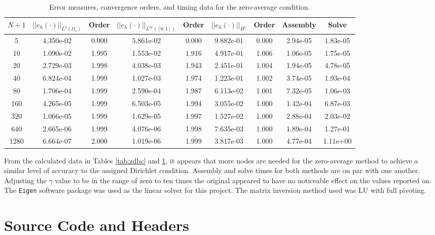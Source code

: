\documentclass[a4paper, 12pt]{article}
\begin{document}
\begin{table}[H]
\caption{ Error measures, convergence orders, and timing data for the zero-average condition.}
\vspace{0.1in}
\centering
\begin{tabular}{|c|c|c|c|c|c|c|c|c|}
\hline
 $N+1$&  $||e_h(\cdot)||_{L^2(\Omega_c)}$ & Order & $||e_h(\cdot)||_{L^\infty([0,1])}$ & Order & $||e_h(\cdot)||_{H^1}$ & Order & Assembly & Solve \\
 \hline   %
5    & 4.350e-02 & 0.000 & 5.861e-02 & 0.000 & 9.882e-01 & 0.000 & 2.94e-05 & 1.83e-05\\
10   & 1.090e-02 & 1.995 & 1.553e-02 & 1.916 & 4.917e-01 & 1.006 & 1.06e-05 & 1.75e-05\\
20   & 2.729e-03 & 1.998 & 4.038e-03 & 1.943 & 2.451e-01 & 1.004 & 1.94e-05 & 4.78e-05\\
40   & 6.824e-04 & 1.999 & 1.027e-03 & 1.974 & 1.223e-01 & 1.002 & 3.74e-05 & 1.93e-04\\
80   & 1.706e-04 & 1.999 & 2.590e-04 & 1.987 & 6.113e-02 & 1.001 & 7.32e-05 & 1.06e-03\\
160  & 4.265e-05 & 1.999 & 6.503e-05 & 1.994 & 3.055e-02 & 1.000 & 1.42e-04 & 6.87e-03\\
320  & 1.066e-05 & 1.999 & 1.629e-05 & 1.997 & 1.527e-02 & 1.000 & 2.88e-04 & 2.03e-02\\
640  & 2.665e-06 & 1.999 & 4.076e-06 & 1.998 & 7.635e-03 & 1.000 & 1.89e-04 & 1.27e-01\\
1280 & 6.664e-07 & 2.000 & 1.019e-06 & 1.999 & 3.817e-03 & 1.000 & 4.77e-04 & 1.11e+00\\
\hline
\end{tabular}
\label{tab:zAve}
\end{table}

From the calculated data in Tables \ref{tab:zdbc} and \ref{tab:zAve},
it appears that more nodes are needed for the zero-average method
to achieve a similar level of accuracy to the assigned Dirichlet condition.
Assembly and solve times for both methods are on par with one another.
Adjusting the $\gamma$ value to be in the range of zero to ten times 
the original appeared to have no noticeable effect on the values reported on.
The \texttt{Eigen} software package
was used as the linear solver for this project. 
The matrix inversion method used was LU with full pivoting.

\newpage
\appendix
\section{Source Code and Headers} \label{sec:code}
\end{document}
